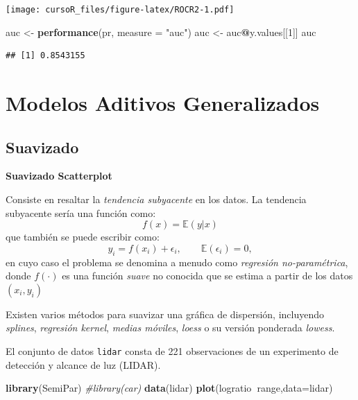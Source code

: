 \documentclass[]{book}
\newenvironment{Shaded}{\begin{snugshade}}{\end{snugshade}}
\newcommand{\KeywordTok}[1]{\textcolor[rgb]{0.13,0.29,0.53}{\textbf{#1}}}
\newcommand{\DataTypeTok}[1]{\textcolor[rgb]{0.13,0.29,0.53}{#1}}
\newcommand{\DecValTok}[1]{\textcolor[rgb]{0.00,0.00,0.81}{#1}}
\newcommand{\StringTok}[1]{\textcolor[rgb]{0.31,0.60,0.02}{#1}}
\newcommand{\CommentTok}[1]{\textcolor[rgb]{0.56,0.35,0.01}{\textit{#1}}}
\newcommand{\OperatorTok}[1]{\textcolor[rgb]{0.81,0.36,0.00}{\textbf{#1}}}
\newcommand{\NormalTok}[1]{#1}
\begin{document}
\texttt{[image: cursoR\_files/figure-latex/ROCR2-1.pdf]}

\begin{Shaded}
\begin{Highlighting}[]
\NormalTok{auc <-}\StringTok{ }\KeywordTok{performance}\NormalTok{(pr, }\DataTypeTok{measure =} \StringTok{"auc"}\NormalTok{)}
\NormalTok{auc <-}\StringTok{ }\NormalTok{auc}\OperatorTok{@}\NormalTok{y.values[[}\DecValTok{1}\NormalTok{]]}
\NormalTok{auc}
\end{Highlighting}
\end{Shaded}

\begin{verbatim}
## [1] 0.8543155
\end{verbatim}

\chapter{Modelos Aditivos
Generalizados}\label{modelos-aditivos-generalizados}

\section{Suavizado}\label{suavizado}

\textbf{Suavizado Scatterplot}

Consiste en resaltar la \emph{tendencia subyacente} en los datos. La
tendencia subyacente sería una función como: \[
f(x) = \mathbb{E}(y|x)
\] que también se puede escribir como: \[
y_i = f(x_i) + \epsilon_i,\qquad \mathbb{E}(\epsilon_i)=0,
\] en cuyo caso el problema se denomina a menudo como \emph{regresión
no-paramétrica}, donde \(f(\cdot)\) es una función \emph{suave} no
conocida que se estima a partir de los datos \((x_i,y_i)\) \bigskip

Existen varios métodos para suavizar una gráfica de dispersión,
incluyendo \emph{splines}, \emph{regresión kernel}, \emph{medias
móviles}, \emph{loess} o su versión ponderada \emph{lowess}.

El conjunto de datos \texttt{lidar} consta de 221 observaciones de un
experimento de detección y alcance de luz (LIDAR).

\begin{Shaded}
\begin{Highlighting}[]
\KeywordTok{library}\NormalTok{(SemiPar)}
\CommentTok{#library(car)}
\KeywordTok{data}\NormalTok{(lidar)}
\KeywordTok{plot}\NormalTok{(logratio}\OperatorTok{~}\NormalTok{range,}\DataTypeTok{data=}\NormalTok{lidar)}
\end{Highlighting}
\end{Shaded}
\end{document}
